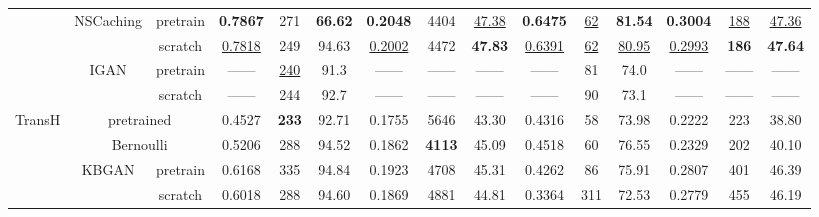 \documentclass[conference]{IEEEtran}
\begin{document}
\begin{table*}[ht]
\begin{tabular}{c|c c|c c c|ccc|ccc|ccc}
	                          & NSCaching & pretrain &  \textbf{0.7867}   & 271             & \textbf{66.62}         &  \textbf{0.2048}   &       4404       &   \underline{47.38}    &  \textbf{0.6475}   &  \underline{62}   &     \textbf{81.54}      &  \textbf{0.3004}   & \underline{188} &   \underline{47.36}    \\
	                          &                 & scratch  & \underline{0.7818} & 249             & 94.63                  & \underline{0.2002} &       4472       &     \textbf{47.83}     & \underline{0.6391} &  \underline{62}   &    \underline{80.95}    & \underline{0.2993} &  \textbf{186}   &     \textbf{47.64}     \\
	                          &      IGAN       & pretrain &       ------       & \underline{240} & 91.3                   &       ------       &      ------      &         ------         &       ------       &        81         &          74.0           &       ------       &     ------      &         ------         \\
	                          &                 & scratch  &       ------       & 244             & 92.7                   &       ------       &      ------      &         ------         &       ------       &        90         &          73.1           &       ------       &     ------      &         ------         \\ \hline
	 \multirow{8}{*}{TransH}  &   \multicolumn{2}{c|}{pretrained}    &       0.4527       & \textbf{233}    & 92.71                  &       0.1755       &       5646       &         43.30          &       0.4316       &       {58}        &          73.98          &       0.2222       &       223       &         38.80          \\
	                          &    \multicolumn{2}{c|}{Bernoulli}    &       0.5206       & 288             & 94.52                  &       0.1862       &  \textbf{4113}   &         45.09          &       0.4518       &       {60}        &          76.55          &       0.2329       &       202       &         40.10          \\
	                          &      KBGAN      & pretrain &       0.6168       & 335             & 94.84                  &       0.1923       &       4708       &         45.31          &       0.4262       &        86         &          75.91          &       0.2807       &       401       &        {46.39}         \\
	                          &                 & scratch  &       0.6018       & 288             & 94.60                  &       0.1869       &       4881       &         44.81          &       0.3364       &        311        &          72.53          &       0.2779       &       455       &         46.19          \\

\end{tabular}
\end{table*}
\end{document}
